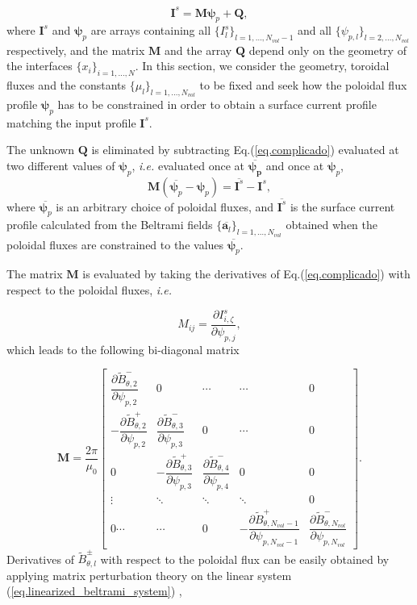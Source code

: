\documentclass[my_thesis.tex]{subfiles}
\begin{document}
\begin{equation}
	\mathbf{I}^s=\mathbf{M}\bm{\psi}_p+\mathbf{Q}\label{eq.complicado},    
\end{equation}
where $\mathbf{I}^s$ and $\bm{\psi}_p$ are arrays containing all $\{I^s_l\}_{l=1,\ldots,N_{vol}-1}$ and all $\{\psi_{p,l}\}_{l=2,\ldots,N_{vol}}$ respectively, and the matrix $\mathbf{M}$ and the  array $\mathbf{Q}$ depend only on the geometry of the interfaces $\{x_i\}_{i=1,\ldots,N}$. In this section, we consider the geometry, toroidal fluxes and the constants $\{\mu_l\}_{l=1,\ldots,N_{vol}}$ to be fixed and seek how the poloidal flux profile $\bm{\psi}_p$ has to be constrained in order to obtain a surface current profile matching the input profile $\mathbf{I}^s$.

The unknown $\mathbf{Q}$ is eliminated by subtracting Eq.(\ref{eq.complicado}) evaluated at two different values of $\bm{\psi}_p$, \textit{i.e.} evaluated once at $\overbar{\bm{\psi_p}}$ and once at $\bm{\psi}_p$,
\begin{equation}
	\mathbf{M} (\overbar{\bm{\psi}_p} - \bm{\psi}_p) = \overbar{\bm{I}^{s}} - \bm{I}^{s}, \label{eq.psip_diff}
\end{equation}
where $\overbar{\bm{\psi}_p}$ is an arbitrary choice of poloidal fluxes, and $\overbar{\bm{I}^s}$ is the surface current profile calculated from the Beltrami fields $\{\overbar{\mathbf{a}_l}\}_{l=1,\ldots,N_{vol}}$ obtained when the poloidal fluxes are constrained to the values $\overbar{\bm{\psi}_p}$.

The matrix $\mathbf{M}$ is evaluated by taking the derivatives of Eq.(\ref{eq.complicado}) with respect to the poloidal fluxes, \textit{i.e.}

\begin{equation}
	M_{ij} = \frac{\partial I^s_{i,\zeta}}{\partial \psi_{p,j}},\label{eq.coef_M}
\end{equation}
which leads to the following bi-diagonal matrix

\begin{equation}
	\mathbf{M} = \frac{2\pi}{\mu_0} \begin{bmatrix}\dfrac{\partial \tilde{B}^-_{\theta,2}}{\partial{\psi_{p,2}}} & 0 & \cdots & \cdots  & 0 \\
		-\dfrac{\partial \tilde{B}^+_{\theta,2}}{\partial{\psi_{p,2}}} & \dfrac{\partial \tilde{B}^-_{\theta,3}}{\partial{\psi_{p,3}}} & 0  & \cdots & 0\\
		0 & -\dfrac{\partial \tilde{B}^+_{\theta,3}}{\partial{\psi_{p,3}}} & \dfrac{\partial \tilde{B}^-_{\theta,4}}{\partial{\psi_{p,4}}} & 0  & 0 \\
		\vdots & \ddots & \ddots  & \ddots & 0\\
		0 \cdots  & \cdots & 0 & -\dfrac{\partial \tilde{B}^+_{\theta,N_{vol}-1}}{\partial{\psi_{p,N_{vol}-1}}} & \dfrac{\partial \tilde{B}^-_{\theta,N_{vol}}}{\partial{\psi_{p,N_{vol}}}}\end{bmatrix}.\label{eq.matrix_M}
\end{equation}
Derivatives of $\tilde{B}^\pm_{\theta,l}$ with respect to the poloidal flux can be easily obtained by applying matrix perturbation theory on the linear system (\ref{eq.linearized_beltrami_system}) \citep{Hudson2012},
\end{document}
